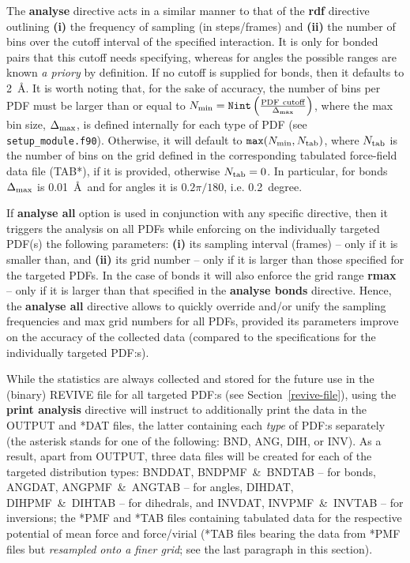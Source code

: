 The {\bf analyse} directive acts in a similar manner to that
of the {\bf rdf} directive outlining {\bf (i)} the frequency
of sampling (in steps/frames) and {\bf (ii)} the number of
bins over the cutoff interval of the specified interaction.
It is only for bonded pairs that this cutoff needs specifying,
whereas for angles the possible ranges are known {\em a priory}
by definition. If no cutoff is supplied for bonds, then it
defaults to 2~\AA.  It is worth noting that, for the sake of
accuracy, the number of bins per PDF must be larger than or equal
to $N_{\rm min} = {\tt Nint} \left( \frac{\rm PDF~cutoff}{\Delta_{\rm max}} \right)$,
where the max bin size, $\Delta_{\rm max}$, is defined internally
for each type of PDF (see {\tt setup\_module.f90}).  Otherwise,
it will default to ${\tt max}(N_{\rm min},N_{\rm tab})$,
where $N_{\rm tab}$ is the number of bins on the grid defined
in the corresponding tabulated force-field data file (TAB*),
if it is provided, otherwise $N_{\rm tab}=0$.
In particular, for bonds $\Delta_{\rm max}$ is 0.01~\AA~and
for angles it is $0.2 \pi/180$, i.e. 0.2~degree.

If {\bf analyse all} option is used in conjunction with any specific
directive, then it triggers the analysis on all PDFs while enforcing
on the individually targeted PDF(s) the following parameters: {\bf (i)}
its sampling interval (frames) -- only if it is smaller than,
and {\bf (ii)} its grid number -- only if it is larger than
those specified for the targeted PDFs.
In the case of bonds it will also enforce the grid range {\bf rmax} --
only if it is larger than that specified in the {\bf analyse bonds}
directive. Hence, the {\bf analyse all} directive allows to
quickly override and/or unify the sampling frequencies and
max grid numbers for all PDFs, provided its parameters improve
on the accuracy of the collected data (compared to the specifications
for the individually targeted PDF:s).

While the statistics are always collected and stored for the
future use in the (binary) REVIVE file for all targeted PDF:s
(see Section~\ref{revive-file}), using the {\bf print analysis}
directive will instruct \D to additionally print the data in
the OUTPUT and *DAT files, the latter containing each {\it type}
of PDF:s separately (the asterisk stands for one of the following: BND,
ANG, DIH, or INV).  As a result, apart from OUTPUT, three data files
will be created for each of the targeted distribution types:
BNDDAT, BNDPMF~\&~BNDTAB -- for bonds, ANGDAT, ANGPMF~\&~ANGTAB
-- for angles, DIHDAT, DIHPMF~\&~DIHTAB -- for dihedrals, and INVDAT,
INVPMF~\&~INVTAB -- for inversions; the *PMF and *TAB files containing
tabulated data for the respective potential of mean force and
force/virial (*TAB files bearing the data from *PMF files but
{\em resampled onto a finer grid}; see the last paragraph
in this section).

